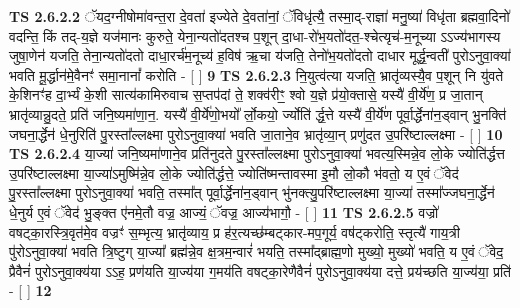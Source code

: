 \documentclass[17pt]{extarticle}
\begin{document}
                  \newline
                                \textbf{ TS 2.6.2.2} \newline
                  ॅयद॒ग्नीषोमा॑वन्त॒रा दे॒वता॑ इज्येते दे॒वता॑नां॒ ॅविधृ॑त्यै॒ तस्मा॒द्-राज्ञा॑ मनु॒ष्या॑ विधृ॑ता ब्रह्मवा॒दिनो॑ वदन्ति॒ किं तद्-य॒ज्ञे यज॑मानः कुरुते॒ येना॒न्यतो॑दतश्च प॒शून् दा॒धा-रो॑भ॒यतो॑दत॒-श्चेत्यृच॑-म॒नूच्या ऽऽज्य॑भागस्य जुषा॒णेन॑ यजति॒ तेना॒न्यतो॑दतो दाधा॒रर्च॑म॒नूच्य॑ ह॒विष॑ ऋ॒चा य॑जति॒ तेनो॑भ॒यतो॑दतो दाधार मूर्द्ध॒न्वती॑ पुरोऽनुवा॒क्या॑ भवति मू॒र्द्धान॑मे॒वैनꣳ॑ समा॒नानां᳚ करोति - [  ] \textbf{  9} \newline
                  \newline
                                \textbf{ TS 2.6.2.3} \newline
                  नि॒युत्व॑त्या यजति॒ भ्रातृ॑व्यस्यै॒व प॒शून् नि यु॑वते के॒शिनꣳ॑ह दा॒र्भ्यं के॒शी सात्य॑कामिरुवाच स॒प्तप॑दां ते॒ शक्व॑रीꣳ॒॒ श्वो य॒ज्ञे प्र॑यो॒क्तासे॒ यस्यै॑ वी॒र्ये॑ण॒ प्र जा॒तान् भ्रातृ॑व्यान्नु॒दते॒ प्रति॑ जनि॒ष्यमा॑णा॒न॒. यस्यै॑ वी॒र्ये॑णो॒भयो᳚ र्लो॒कयो॒ र्ज्योति॑ र्द्ध॒त्ते यस्यै॑ वी॒र्ये॑ण पूर्वा॒र्द्धेना॑न॒ड्वान् भु॒नक्ति॑ जघना॒र्द्धेन॑ धे॒नुरिति॑ पु॒रस्ता᳚ल्लक्ष्मा पुरोऽनुवा॒क्या॑ भवति जा॒ताने॒व भ्रातृ॑व्या॒न् प्रणु॑दत उ॒परि॑ष्टाल्लक्ष्मा - [  ] \textbf{  10} \newline
                  \newline
                                \textbf{ TS 2.6.2.4} \newline
                  या॒ज्या॑ जनि॒ष्यमा॑णाने॒व प्रति॑नुदते पु॒रस्ता᳚ल्लक्ष्मा पुरोऽनुवा॒क्या॑ भवत्य॒स्मिन्ने॒व लो॒के ज्योति॑र्द्धत्त उ॒परि॑ष्टाल्लक्ष्मा या॒ज्या॑ऽमुष्मि॑न्ने॒व लो॒के ज्योति॑र्द्धत्ते॒ ज्योति॑ष्मन्तावस्मा इ॒मौ लो॒कौ भ॑वतो॒ य ए॒वं ॅवेद॑ पु॒रस्ता᳚ल्लक्ष्मा पुरोऽनुवा॒क्या॑ भवति॒ तस्मा᳚त् पूर्वा॒र्द्धेना॑न॒ड्वान् भु॑नक्त्यु॒परि॑ष्टाल्लक्ष्मा या॒ज्या॑ तस्मा᳚ज्जघना॒र्द्धेन॑ धे॒नुर्य ए॒वं ॅवेद॑ भु॒ङ्क्त ए॑नमे॒तौ वज्र॒ आज्यं॒ ॅवज्र॒ आज्य॑भागौ॒ - [  ] \textbf{  11} \newline
                  \newline
                                \textbf{ TS 2.6.2.5} \newline
                  वज्रो॑ वषट्का॒रस्त्रि॒वृत॑मे॒व वज्रꣳ॑ स॒म्भृत्य॒ भ्रातृ॑व्याय॒ प्र ह॑र॒त्यच्छ॑म्बट्कार-मप॒गूर्य॒ वष॑ट्करोति॒ स्तृत्यै॑ गाय॒त्री पु॑रोऽनुवा॒क्या॑ भवति त्रि॒ष्टुग् या॒ज्या᳚ ब्रह्म॑न्ने॒व क्ष॒त्रम॒न्वारं॑ भयति॒ तस्मा᳚द्ब्राह्म॒णो मुख्यो॒ मुख्यो॑ भवति॒ य ए॒वं ॅवेद॒ प्रैवैनं॑ पुरोऽनुवा॒क्य॑या ऽऽह॒ प्रण॑यति या॒ज्य॑या ग॒मय॑ति वषट्का॒रेणैवैनं॑ पुरोऽनुवा॒क्य॑या दत्ते॒ प्रय॑च्छति या॒ज्य॑या॒ प्रति॑ - [  ] \textbf{  12} \newline
\end{document}
